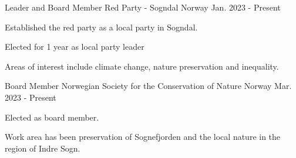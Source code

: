 

\begin{cventries}

  \cventry
    {Leader and Board Member} %
    {Red Party - Sogndal} %
    {Norway} %
    {Jan. 2023 - Present} %
    {
      \begin{cvitems} %
        \item {Established the red party as a local party in Sogndal.}
        \item {Elected for 1 year as local party leader}
        \item {Areas of interest include climate change, nature preservation and inequality.}
      \end{cvitems}
    }

  \cventry
    {Board Member} %
    {Norwegian Society for the Conservation of Nature} %
    {Norway} %
    {Mar. 2023 - Present} %
    {
      \begin{cvitems} %
        \item {Elected as board member.}
        \item {Work area has been preservation of Sognefjorden and the local nature in the region of Indre Sogn.}
      \end{cvitems}
    }

\end{cventries}
